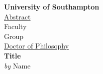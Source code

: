 \thispagestyle{empty}

 \begin{center}
     \textbf{\textcolor{sotonMarineBlue}{University of Southampton}} \\
     \vspace{8pt}
     \underline{Abstract} \\
     \vspace{8pt}
     Faculty \\
     Group \\
     \vspace{8pt}
     \underline{Doctor of Philosophy} \\
     \vspace{8pt}
     \textbf{Title} \\
     \vspace{8pt}
     \textit{by} Name
 \end{center}

\vspace{0.5cm}
\singlespacing

\lipsum[1-4]

\onehalfspacing

